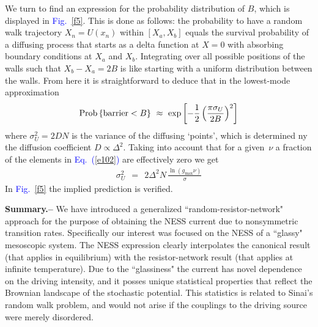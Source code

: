 \documentclass[aps,prl,floats,floatfix,twocolumn]{revtex4}
\newcommand{\mylabel}[1]{\label{#1}}
\newcommand{\beq}{\begin{eqnarray}}
\newcommand{\eeq}{\end{eqnarray}}
\newcommand{\be}[1]{\begin{eqnarray}\ifthenelse{#1=-1}
{\nonumber}{\ifthenelse{#1=0}{}{\mylabel{e#1}}}}
\newcommand{\sect}[1]{{\bf #1.-- }}
\newcommand{\Eq}[1]{\textcolor{blue}{Eq.\!\!~(\ref{#1})}}
\newcommand{\Fig}[1]{\textcolor{blue}{Fig.}\!\!~\ref{#1}}
\begin{document}
We turn to find an expression for the probability distribution 
of $B$, which is displayed in \Fig{f5}.   
This is done as follows: the probability 
to have a random walk trajectory $X_n=U(x_n)$ within $[X_a,X_b]$ 
equals the survival probability of a diffusing process  
that starts as a delta function at ${X=0}$ 
with absorbing boundary conditions at $X_a$ and $X_b$.   
Integrating over all possible positions of the walls 
such that ${X_b-X_a=2B}$ is like starting with a 
uniform distribution between the walls. From here 
it is straightforward to deduce that in the lowest-mode
approximation
%
\be{20}
\text{Prob}\left\{\text{barrier}<B\right\} \ \approx \ \exp\left[-\frac{1}{2} \left(\frac{\pi \sigma_U}{2B}\right)^2\right] 
\eeq
%
where $\sigma_U^2 = 2D N$ is the variance of the diffusing `points', 
which is determined ny the diffusion coefficient $D\propto \Delta^2$.
Taking into account that for a given~$\nu$ a fraction of the elements
in \Eq{e102} are effectively zero we get 
%
\beq
\sigma_U^2 \ \ = \ \ 2 \Delta^2 N  \, \frac{\ln(g_{\text{max}}\nu)}{\sigma}
\eeq  
%  
In \Fig{f5} the implied prediction is verified.

\sect{Summary}
%
%
We have introduced a generalized ``random-resistor-network"
approach for the purpose of obtaining the NESS current
due to nonsymmetric transition rates. Specifically our 
interest was focused on the NESS of a ``glassy" mesoscopic system. 
The NESS expression clearly interpolates the canonical result 
(that applies in equilibrium) with the resistor-network result 
(that applies at infinite temperature). 
Due to the ``glassiness" the current has novel dependence 
on the driving intensity, and it posses unique statistical properties 
that reflect the Brownian landscape of the stochastic potential.
This statistics is related to Sinai's random walk problem, 
and would not arise if the couplings to the driving source 
were merely disordered.


\clearpage
\end{document}
